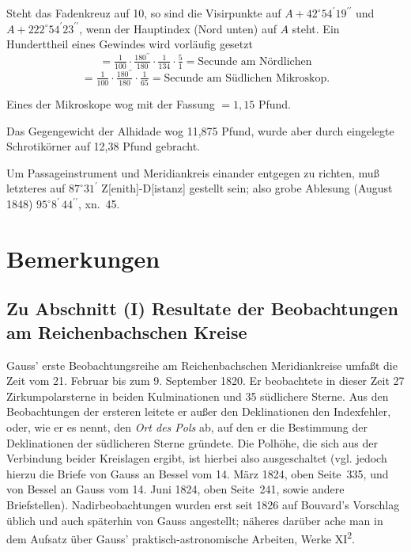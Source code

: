 \documentclass[12pt,a4paper]{article}
\theoremstyle{plain}
\theoremstyle{definition}
\theoremstyle{remark}
\begin{document}
Steht das Fadenkreuz auf 10, so sind die Visirpunkte auf $A + 42^{\circ}54^{\prime}19^{\prime\prime}$ und $A + 222^{\circ}54^{\prime}23^{\prime\prime}$, wenn der Hauptindex (Nord unten) auf $A$ steht. Ein Hunderttheil eines Gewindes wird vorl\"aufig gesetzt
\[
= \tfrac{1}{100}\cdot\tfrac{180^{\prime\prime}}{180}\cdot\tfrac{1}{134}\cdot\tfrac{5}{1} = \text{Secunde am N\"ordlichen}
\]
\[
= \tfrac{1}{100}\cdot\tfrac{180^{\prime\prime}}{180}\cdot\tfrac{1}{65} = \text{Secunde am S\"udlichen Mikroskop}.
\]

Eines der Mikroskope wog mit der Fassung $= 1{,}15$ Pfund.

Das Gegengewicht der Alhidade wog 11,875 Pfund, wurde aber durch eingelegte Schrotik\"orner auf 12,38 Pfund gebracht.

Um Passageinstrument und Meridiankreis einander entgegen zu richten, mu\ss{} letzteres auf $87^{\circ}31^{\prime}$ Z[enith]-D[istanz] gestellt sein; also grobe Ablesung (August 1848) $95^{\circ}8^{\prime}\,44^{\prime\prime}$, xn.~45.

\newpage

\section*{Bemerkungen}

\subsection*{Zu Abschnitt (I) Resultate der Beobachtungen am Reichenbachschen Kreise}

Gauss' erste Beobachtungsreihe am Reichenbachschen Meridiankreise umfa\ss t die Zeit vom 21. Februar bis zum 9. September 1820. Er beobachtete in dieser Zeit 27 Zirkumpolarsterne in beiden Kulminationen und 35 s\"udlichere Sterne. Aus den Beobachtungen der ersteren leitete er au\ss er den Deklinationen den Indexfehler, oder, wie er es nennt, den \emph{Ort des Pols} ab, auf den er die Bestimmung der Deklinationen der s\"udlicheren Sterne gr\"undete. Die Polh\"ohe, die sich aus der Verbindung beider Kreislagen ergibt, ist hierbei also ausgeschaltet (vgl. jedoch hierzu die Briefe von Gauss an Bessel vom 14. M\"arz 1824, oben Seite~335, und von Bessel an Gauss vom 14. Juni 1824, oben Seite~241, sowie andere Briefstellen). Nadirbeobachtungen wurden erst seit 1826 auf Bouvard's Vorschlag \"ublich und auch sp\"aterhin von Gauss angestellt; n\"aheres dar\"uber ache man in dem Aufsatz \"uber Gauss' praktisch-astronomische Arbeiten, Werke XI\textsuperscript{2}.
\end{document}
